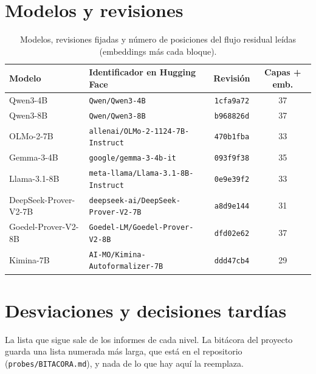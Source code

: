 \documentclass[10pt]{article}
\newcommand{\vr}[1]{\texttt{#1}}
\begin{document}
\section{Modelos y revisiones}\label{app:modelos}
\begin{table}[h]
\centering
\caption{Modelos, revisiones fijadas y número de posiciones del flujo residual leídas (embeddings más cada bloque).}
\vspace{2pt}
\begin{tabular}{@{}llcc@{}}
\toprule
Modelo & Identificador en Hugging Face & Revisión & Capas + emb.\\
\midrule
Qwen3-4B              & \vr{Qwen/Qwen3-4B}                         & \vr{1cfa9a72} & 37\\
Qwen3-8B              & \vr{Qwen/Qwen3-8B}                         & \vr{b968826d} & 37\\
OLMo-2-7B             & \vr{allenai/OLMo-2-1124-7B-Instruct}       & \vr{470b1fba} & 33\\
Gemma-3-4B            & \vr{google/gemma-3-4b-it}                  & \vr{093f9f38} & 35\\
Llama-3.1-8B          & \vr{meta-llama/Llama-3.1-8B-Instruct}      & \vr{0e9e39f2} & 33\\
DeepSeek-Prover-V2-7B & \vr{deepseek-ai/DeepSeek-Prover-V2-7B}     & \vr{a8d9e144} & 31\\
Goedel-Prover-V2-8B   & \vr{Goedel-LM/Goedel-Prover-V2-8B}         & \vr{dfd02e62} & 37\\
Kimina-7B             & \vr{AI-MO/Kimina-Autoformalizer-7B}        & \vr{ddd47cb4} & 29\\
\bottomrule
\end{tabular}
\end{table}

\section{Desviaciones y decisiones tardías}\label{app:desviaciones}

La lista que sigue sale de los informes de cada nivel. La bitácora del proyecto guarda una lista numerada más larga,
que está en el repositorio (\vr{probes/BITACORA.md}), y nada de lo que hay aquí la reemplaza.
\end{document}
